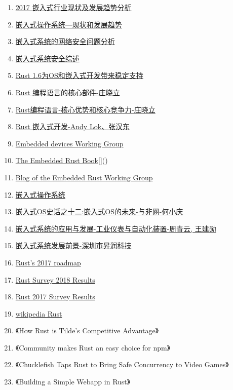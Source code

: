 \documentclass[12pt, a4paper]{article}
\begin{document}
\begin{enumerate}
	\item \href{https://www.jianshu.com/p/f965e83f78f9}{2017 嵌入式行业现状及发展趋势分析} 
	\item \href{https://wenku.baidu.com/view/7c7bab64caaedd3382c4d301}{嵌入式操作系统---现状和发展趋势} 
	\item \href{https://www.jianshu.com/p/866a9c757f72}{嵌入式系统的网络安全问题分析}
	\item \href{http://www.xml-data.org/whdy/html/dec010e3-2734-4788-a199-2fa04f09b9d7.htm#rhhz}{嵌入式系统安全综述}
	\item \href{https://www.open-open.com/news/view/121b0b3}{Rust 1.6为OS和嵌入式开发带来稳定支持} 
	\item \href{https://www.infoq.cn/article/rust-core-components}{Rust 编程语言的核心部件-庄晓立}
	\item \href{https://docs.huihoo.com/infoq/qconbeijing/2016/day3/%E7%BC%96%E7%A8%8B%E8%AF%AD%E8%A8%80%E5%AE%9E%E6%88%98%E4%B8%93%E9%A2%98/3-2-Rust%E8%AF%AD%E8%A8%80%E6%A0%B8%E5%BF%83%E7%AB%9E%E4%BA%89%E5%8A%9B-%E5%BA%84%E6%99%93%E7%AB%8B.pdf}{Rust编程语言-核心优势和核心竞争力-庄晓立}
	\item \href{https://zhuanlan.zhihu.com/embedded-rust}{Rust 嵌入式开发-Andy Lok、张汉东} 
	\item \href{https://github.com/rust-embedded/wg}{Embedded devices Working Group}
	\item \href{https://docs.rust-embedded.org/book/}{The Embedded Rust Book}[]()  
	\item \href{https://rust-embedded.github.io/blog/}{Blog of the Embedded Rust Working Group}
	\item \href{https://baike.baidu.com/item/%E5%B5%8C%E5%85%A5%E5%BC%8F%E6%93%8D%E4%BD%9C%E7%B3%BB%E7%BB%9F#7}{嵌入式操作系统} 
	\item \href{http://www.embeddedlinux.org.cn/html/xinshourumen/201408/15-3012.html}{嵌入式OS史话之十二:嵌入式OS的未来-与非网-何小庆}
	\item \href{http://210.42.35.80/G2S/eWebEditor/uploadfile/20131204120158007.pdf}{嵌入式系统的应用与发展-工业仪表与自动化装置-周青云, 王建勋}
	\item \href{http://www.sohu.com/a/158359113_404276}{嵌入式系统发展前景-深圳市昇润科技}  
	\item \href{https://blog.rust-lang.org/2017/07/05/Rust-Roadmap-Update.html}{Rust's 2017 roadmap}
	\item \href{https://blog.rust-lang.org/2018/11/27/Rust-survey-2018.html}{Rust Survey 2018 Results}
	\item \href{https://blog.rust-lang.org/2017/09/05/Rust-2017-Survey-Results.html}{Rust 2017 Survey Results}
	\item \href{https://en.wikipedia.org/wiki/Rust}{wikipedia Rust}
	\item 《How Rust is Tilde’s Competitive Advantage》
	\item 《Community makes Rust an easy choice for npm》
	\item 《Chucklefish Taps Rust to Bring Safe Concurrency to Video Games》
	\item 《Building a Simple Webapp in Rust》
\end{enumerate}
\end{document}
